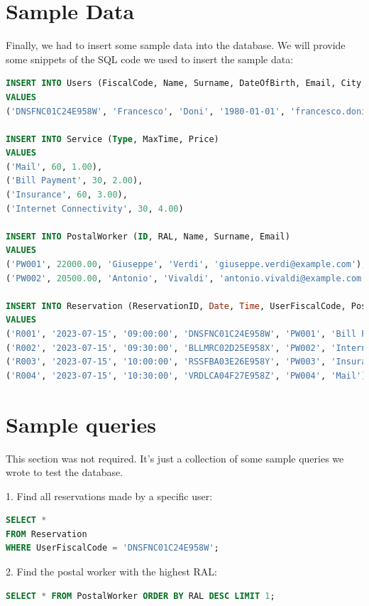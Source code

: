 \documentclass{article}
\begin{document}
\section{Sample Data}
Finally, we had to insert some sample data into the database. We will provide some snippets of the SQL code we used to insert the sample data:
\begin{lstlisting}[language=SQL]
INSERT INTO Users (FiscalCode, Name, Surname, DateOfBirth, Email, City, ZIP, Address)
VALUES
('DNSFNC01C24E958W', 'Francesco', 'Doni', '1980-01-01', 'francesco.doni@example.com', 'Rome', '00147', 'Via Roma 10'),

INSERT INTO Service (Type, MaxTime, Price)
VALUES
('Mail', 60, 1.00),
('Bill Payment', 30, 2.00),
('Insurance', 60, 3.00),
('Internet Connectivity', 30, 4.00)

INSERT INTO PostalWorker (ID, RAL, Name, Surname, Email)
VALUES
('PW001', 22000.00, 'Giuseppe', 'Verdi', 'giuseppe.verdi@example.com'),
('PW002', 20500.00, 'Antonio', 'Vivaldi', 'antonio.vivaldi@example.com')

INSERT INTO Reservation (ReservationID, Date, Time, UserFiscalCode, PostalWorkerID, TypeOfService)
VALUES
('R001', '2023-07-15', '09:00:00', 'DNSFNC01C24E958W', 'PW001', 'Bill Payment'),
('R002', '2023-07-15', '09:30:00', 'BLLMRC02D25E958X', 'PW002', 'Internet Connectivity'),
('R003', '2023-07-15', '10:00:00', 'RSSFBA03E26E958Y', 'PW003', 'Insurance'),
('R004', '2023-07-15', '10:30:00', 'VRDLCA04F27E958Z', 'PW004', 'Mail'),
\end{lstlisting}

\section{Sample queries}
This section was not required. It's just a collection of some sample queries we wrote to test the database.

1. Find all reservations made by a specific user:

\begin{lstlisting}[language=SQL]
SELECT *
FROM Reservation
WHERE UserFiscalCode = 'DNSFNC01C24E958W';
\end{lstlisting}

2. Find the postal worker with the highest RAL\@:

\begin{lstlisting}[language=SQL]
    SELECT * FROM PostalWorker ORDER BY RAL DESC LIMIT 1;
\end{lstlisting}
\end{document}
